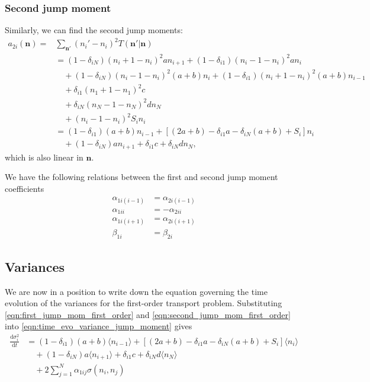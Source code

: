 \documentclass[a4paper,11pt]{article}
\numberwithin{equation}{section}
\newcommand{\diff}[2]{\frac{\mathrm{d} #1}{\mathrm{d} #2}}
\newcommand{\V}[1]{\mathbf{#1}}
\newcommand{\E}[1]{\langle #1 \rangle}
\begin{document}
\subsubsection{Second jump moment}
Similarly, we can find the second jump moments:
\begin{equation}
    \begin{aligned}
        a_{2i}(\V{n}) =& \sum_{\V{n}'} (n_i' - n_i)^2 T(\V{n}' | \V{n})\\
        &= (1-\delta_{iN})(n_i + 1 - n_i)^2a n_{i+1}
        +  (1-\delta_{i1})(n_i - 1 - n_i)^2a n_i\\
        &\quad+ (1-\delta_{iN})(n_i - 1 - n_i)^2(a+b) n_i
        +  (1-\delta_{i1})(n_i + 1 - n_i)^2(a+b) n_{i-1}\\
        &\quad+ \delta_{i1}(n_1 + 1 - n_1)^2 c\\
        &\quad+ \delta_{iN}(n_N - 1 - n_N)^2 d n_N\\
        &\quad+ (n_i - 1 - n_i)^2 S_i n_i\\
        &= (1-\delta_{i1})(a+b)n_{i-1} + \left[(2a+b) - \delta_{i1}a -
        \delta_{iN}(a+b) + S_i\right]n_i\\
        &\quad+ (1-\delta_{iN})an_{i+1} + \delta_{i1}c + \delta_{iN}d n_N,
    \end{aligned}
    \label{eqn:second_jump_mom_first_order}
\end{equation}
which is also linear in \(\V{n}\).

We have the following relations between the first and second jump moment
coefficients
\begin{align*}
    \alpha_{1i(i-1)} &= \alpha_{2i(i-1)}\\
    \alpha_{1ii} &= -\alpha_{2ii}\\
    \alpha_{1i(i+1)} &= \alpha_{2i(i+1)}\\
    \beta_{1i} &= \beta_{2i}
\end{align*}

\subsection{Variances}
We are now in a position to write down the equation governing the time
evolution of the variances for the first-order transport problem. Substituting
\eqref{eqn:first_jump_mom_first_order} and
\eqref{eqn:second_jump_mom_first_order} into
\eqref{eqn:time_evo_variance_jump_moment} gives
\begin{equation}
    \begin{aligned}
        \diff{\sigma_i^2}{t} &= (1-\delta_{i1})(a+b)\E{n_{i-1}} +
        \left[(2a+b) - \delta_{i1}a - \delta_{iN}(a+b) + S_i\right]\E{n_i}\\
        &\quad+ (1-\delta_{iN})a\E{n_{i+1}} + \delta_{i1}c + \delta_{iN}d \E{n_N}\\
        &\quad+ 2 \sum_{j=1}^N \alpha_{1ij} \sigma(n_i,n_j)
    \end{aligned}
    \label{eqn:time_evo_variance_first_order}
\end{equation}
\end{document}
